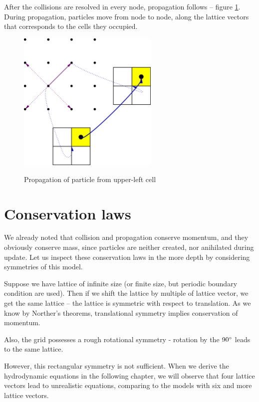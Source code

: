 After the collisions are resolved in every node, propagation follows -- figure \ref{hpp-prop}.
During propagation, particles move from node to node, along the lattice vectors that corresponds to the cells they occupied.
\begin{figure} [H]
 \centering
 \includegraphics[width=0.6\textwidth]{./img/HPPprop}
 \label{hpp-prop}
 \caption{Propagation of particle from upper-left cell}
\end{figure}

\bigskip

\section{Conservation laws}

We already noted that collision and propagation conserve momentum, and they obviously conserve mass, since particles are neither created, nor anihilated during update. 
Let us inspect these conservation laws in the more depth by considering symmetries of this model.

Suppose we have lattice of infinite size (or finite size, but periodic boundary condition are used). Then if we shift the lattice by multiple of lattice vector, we get the same lattice -- the lattice is symmetric with respect to translation.
As we know by Norther's theorems, translational symmetry implies conservation of momentum.

\bigskip

Also, the grid possesses a rough rotational symmetry - rotation by the $90\degree$ leads to the same lattice.

However, this rectangular symmetry is not sufficient.
When we derive the hydrodynamic equations in the following chapter, we will observe that four lattice vectors lead to unrealistic equations, comparing to the models with six and more lattice vectors.

